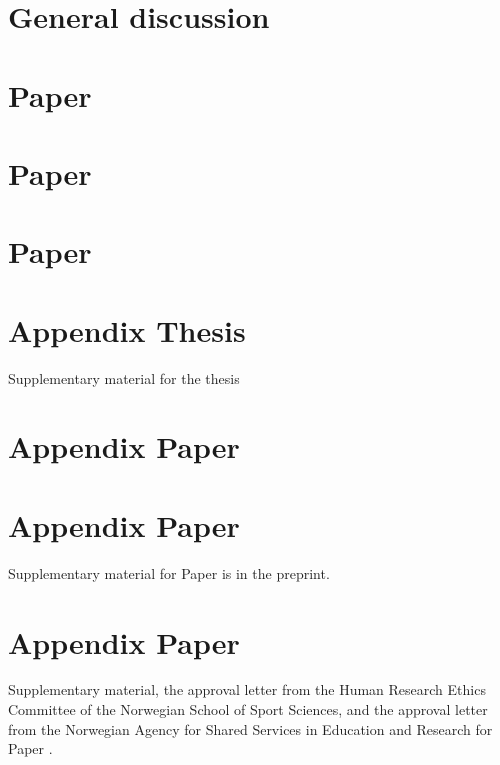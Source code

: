 \documentclass[12pt, twoside]{report}
\begin{document}
\chapter{General discussion}


%


\printbibliography[]

\clearpage
{}


\chapter*{Paper } 




\chapter*{Paper } 




\chapter*{Paper } 




\appendix

\chapter{Appendix Thesis}
Supplementary material for the thesis
\newpage


\chapter{Appendix Paper }


\chapter{Appendix Paper }
Supplementary material for Paper  is in the preprint.


\chapter{Appendix Paper }
Supplementary material, the approval letter from the Human Research Ethics Committee of the Norwegian School of Sport Sciences, and the approval letter from the Norwegian Agency for Shared Services in Education and Research for Paper .

\end{document}

